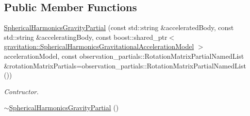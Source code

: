 \subsection*{Public Member Functions}
\begin{DoxyCompactItemize}
\item 
\hyperlink{classtudat_1_1acceleration__partials_1_1SphericalHarmonicsGravityPartial_a938149428ee9fcce9b6614c98c42492c}{Spherical\+Harmonics\+Gravity\+Partial} (const std\+::string \&accelerated\+Body, const std\+::string \&accelerating\+Body, const boost\+::shared\+\_\+ptr$<$ \hyperlink{classtudat_1_1gravitation_1_1SphericalHarmonicsGravitationalAccelerationModel}{gravitation\+::\+Spherical\+Harmonics\+Gravitational\+Acceleration\+Model} $>$ acceleration\+Model, const observation\+\_\+partials\+::\+Rotation\+Matrix\+Partial\+Named\+List \&rotation\+Matrix\+Partials=observation\+\_\+partials\+::\+Rotation\+Matrix\+Partial\+Named\+List())
\begin{DoxyCompactList}\small\item\em Contructor. \end{DoxyCompactList}\item 
\hyperlink{classtudat_1_1acceleration__partials_1_1SphericalHarmonicsGravityPartial_a2d502a2bd15dfc8a825d115ba5ea5b5e}{$\sim$\+Spherical\+Harmonics\+Gravity\+Partial} ()\hypertarget{classtudat_1_1acceleration__partials_1_1SphericalHarmonicsGravityPartial_a2d502a2bd15dfc8a825d115ba5ea5b5e}{}\label{classtudat_1_1acceleration__partials_1_1SphericalHarmonicsGravityPartial_a2d502a2bd15dfc8a825d115ba5ea5b5e}


\end{DoxyCompactItemize}
